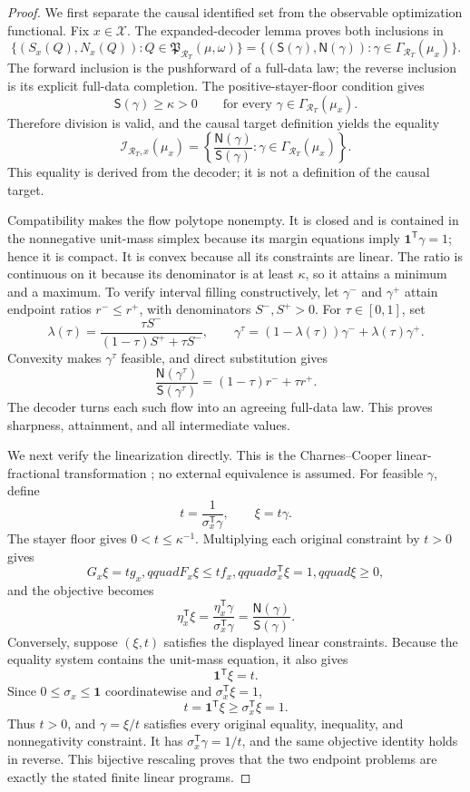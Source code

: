 \documentclass{article}
\begin{document}
\begin{proof}
We first separate the causal identified set from the observable optimization functional.  Fix \(x\in\mathcal X\).  The expanded-decoder lemma proves both inclusions in
\[
 \{(S_x(Q),N_x(Q)):Q\in\mathfrak P_{\mathcal R_T}(\mu,\omega)\}
 =\{(\mathsf S(\gamma),\mathsf N(\gamma)):
 \gamma\in\Gamma_{\mathcal R_T}(\mu_x)\}.
\]
The forward inclusion is the pushforward of a full-data law; the reverse inclusion is its explicit full-data completion.  The positive-stayer-floor condition gives
\[
 \mathsf S(\gamma)\ge\kappa>0
 \qquad
 \text{for every }\gamma\in\Gamma_{\mathcal R_T}(\mu_x).
\]
Therefore division is valid, and the causal target definition yields the equality
\[
 \mathcal I_{\mathcal R_T,x}(\mu_x)
 =\left\{
 \frac{\mathsf N(\gamma)}{\mathsf S(\gamma)}:
 \gamma\in\Gamma_{\mathcal R_T}(\mu_x)
 \right\}.
\]
This equality is derived from the decoder; it is not a definition of the causal target.

Compatibility makes the flow polytope nonempty.  It is closed and is contained in the nonnegative unit-mass simplex because its margin equations imply \(\mathbf 1^{\mathsf T}\gamma=1\); hence it is compact.  It is convex because all its constraints are linear.  The ratio is continuous on it because its denominator is at least \(\kappa\), so it attains a minimum and a maximum.  To verify interval filling constructively, let \(\gamma^-\) and \(\gamma^+\) attain endpoint ratios \(r^-\le r^+\), with denominators \(S^-,S^+>0\).  For \(\tau\in[0,1]\), set
\[
 \lambda(\tau)=
 \frac{\tau S^-}{(1-\tau)S^++\tau S^-},
 \qquad
 \gamma^{\tau}=(1-\lambda(\tau))\gamma^-+
 \lambda(\tau)\gamma^+.
\]
Convexity makes \(\gamma^{\tau}\) feasible, and direct substitution gives
\[
 \frac{\mathsf N(\gamma^{\tau})}{\mathsf S(\gamma^{\tau})}
 =(1-\tau)r^-+\tau r^+.
\]
The decoder turns each such flow into an agreeing full-data law.  This proves sharpness, attainment, and all intermediate values.

We next verify the linearization directly.  This is the Charnes--Cooper linear-fractional transformation \cite{CharnesCooper1962}; no external equivalence is assumed.  For feasible \(\gamma\), define
\[
 t=\frac{1}{\sigma_x^{\mathsf T}\gamma},
 \qquad
 \xi=t\gamma.
\]
The stayer floor gives \(0<t\le\kappa^{-1}\).  Multiplying each original constraint by \(t>0\) gives
\[
 G_x\xi=tg_x,qquad
 F_x\xi\le tf_x,qquad
 \sigma_x^{\mathsf T}\xi=1,qquad
 \xi\ge0,
\]
and the objective becomes
\[
 \eta_x^{\mathsf T}\xi
 =\frac{\eta_x^{\mathsf T}\gamma}
 {\sigma_x^{\mathsf T}\gamma}
 =\frac{\mathsf N(\gamma)}{\mathsf S(\gamma)}.
\]
Conversely, suppose \((\xi,t)\) satisfies the displayed linear constraints.  Because the equality system contains the unit-mass equation, it also gives
\[
 \mathbf 1^{\mathsf T}\xi=t.
\]
Since \(0\le\sigma_x\le\mathbf 1\) coordinatewise and \(\sigma_x^{\mathsf T}\xi=1\),
\[
 t=\mathbf 1^{\mathsf T}\xi
 \ge\sigma_x^{\mathsf T}\xi=1.
\]
Thus \(t>0\), and \(\gamma=\xi/t\) satisfies every original equality, inequality, and nonnegativity constraint.  It has \(\sigma_x^{\mathsf T}\gamma=1/t\), and the same objective identity holds in reverse.  This bijective rescaling proves that the two endpoint problems are exactly the stated finite linear programs.


\end{proof}
\end{document}
